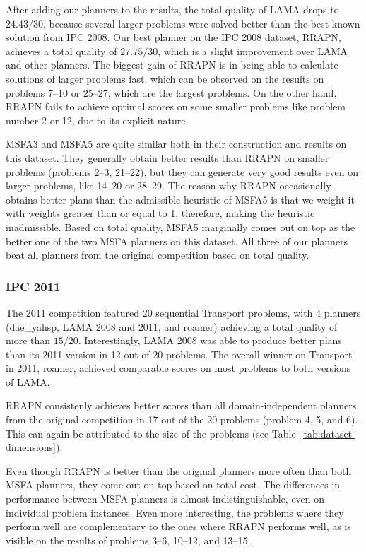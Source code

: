 After adding our planners to the results,
the total quality of LAMA drops to $24.43/30$,
because several larger problems were solved better than the
best known solution from IPC 2008.
Our best planner on the IPC 2008 dataset, RRAPN, achieves a total quality of $27.75/30$,
which is a slight improvement over LAMA and other planners. The biggest gain of RRAPN is in being able to calculate
solutions of larger problems fast, which can be observed on
the results on problems 7--10 or 25--27,
which are the largest problems.
On the other hand, RRAPN fails to achieve optimal scores
on some smaller problems like problem number 2 or 12,
due to its explicit nature.

MSFA3 and MSFA5 are quite similar both in their construction and results on this dataset.
They generally obtain better results than RRAPN on smaller problems
(problems 2--3, 21--22),
but they can generate very good results even on larger problems,
like 14--20 or 28--29.
The reason why RRAPN occasionally obtains better plans than the
admissible heuristic of MSFA5 is that we weight it
with weights greater than or equal to 1,
therefore, making the heuristic inadmissible.
Based on total quality, MSFA5 marginally comes out on top as the better one of the two MSFA planners on this dataset.
All three of our planners beat all planners from the original competition based on total quality.

\subsubsection{IPC 2011}

The 2011 competition featured 20 sequential Transport problems,
with 4 planners (dae\_yahsp, LAMA 2008 and 2011, and roamer) achieving a total quality of more than $15/20$.
Interestingly, LAMA 2008 was able to produce better plans than its 2011 version in 12 out of 20 problems. The overall winner on Transport in 2011, roamer, achieved comparable scores on most problems to both versions of LAMA.

RRAPN consistenly achieves better scores than all domain-independent planners from the original competition in 17 out of the 20 problems (problem 4, 5, and 6). This can again be attributed to the size
of the problems (see Table~\ref{tab:dataset-dimensions}).

Even though RRAPN is better than the original planners more often than both MSFA planners,
they come out on top based on total cost.
The differences in performance between MSFA planners
is almost indistinguishable, even on individual problem instances.
Even more interesting, the problems
where they perform well are complementary to the ones where RRAPN performs well,
as is visible on the results of problems 3--6, 10--12, and 13--15.

